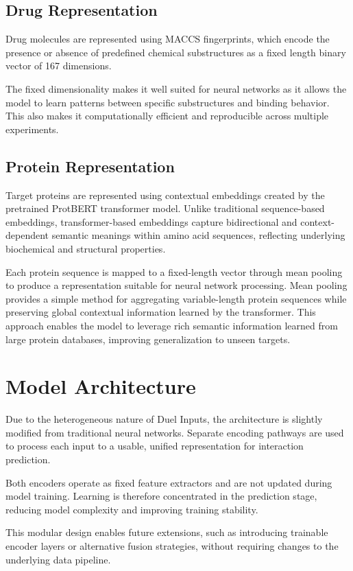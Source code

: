 \subsection{Drug Representation}
Drug molecules are represented using MACCS fingerprints, which encode the presence or absence of predefined chemical substructures as a fixed length binary vector of 167 dimensions.

The fixed dimensionality makes it well suited for neural networks as it allows the model to learn patterns between specific substructures and binding behavior. This also makes it computationally efficient and reproducible across multiple experiments.
\subsection{Protein Representation}
Target proteins are represented using contextual embeddings created by the pretrained ProtBERT transformer model. Unlike traditional sequence-based embeddings, transformer-based embeddings capture bidirectional and context-dependent semantic meanings within amino acid sequences, reflecting underlying biochemical and structural properties.

Each protein sequence is mapped to a fixed-length vector through mean pooling to produce a representation suitable for neural network processing. Mean pooling provides a simple method for aggregating variable-length protein sequences while preserving global contextual information learned by the transformer. This approach enables the model to leverage rich semantic information learned from large protein databases, improving generalization to unseen targets.

\section{Model Architecture}
Due to the heterogeneous nature of Duel Inputs, the architecture is slightly modified from traditional neural networks. Separate encoding pathways are used to process each input to a usable, unified representation for interaction prediction.

Both encoders operate as fixed feature extractors and are not updated during model training. Learning is therefore concentrated in the prediction stage, reducing model complexity and improving training stability.

This modular design enables future extensions, such as introducing trainable encoder layers or alternative fusion strategies, without requiring changes to the underlying data pipeline.
